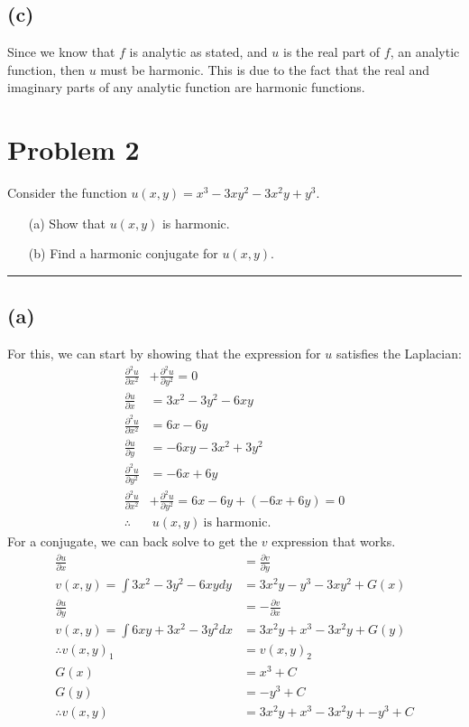 \documentclass{article}
\newcommand{\parder}[2]{\frac{\partial#1}{\partial#2}}
\newcommand{\secparder}[2]{\frac{\partial^2#1}{\partial#2^2}}
\begin{document}
\subsection{(c)}
Since we know that $f$ is analytic as stated, and $u$ is the real part of $f$, an analytic function, then $u$ must be harmonic. This is due to the fact that the real and imaginary parts of any analytic function are harmonic functions.
\newpage
\section*{Problem 2}
Consider the function  $u(x,y) = x^3 - 3 x y^2 - 3 x^2 y + y^3$.

\begin{enumerate}
	\item [(a)] Show that $u(x,y)$ is harmonic.
	\item [(b)] Find a harmonic conjugate for $u(x,y)$.
\end{enumerate}


\vspace{.5cm} %

\hrule
\subsection*{(a)}
For this, we can start by showing that the expression for $u$ satisfies the Laplacian:
\begin{align*}
  \secparder{u}{x} &+ \secparder{u}{y} = 0\\
  \parder{u}{x} &= 3x^2 - 3 y^2 - 6xy\\
  \secparder{u}{x} &= 6x - 6y\\
  \parder{u}{y} &= - 6 x y - 3 x^2  + 3y^2\\
  \secparder{u}{y} &= - 6 x  + 6y\\
  \secparder{u}{x} &+ \secparder{u}{y} = 6x - 6y + (- 6 x  + 6y) = 0\\
  \therefore &\ u(x,y)\ \text{is harmonic.}
\end{align*}
For a conjugate, we can back solve to get the $v$ expression that works.
\begin{align*}
  \parder{u}{x} &= \parder{v}{y} \\
  v(x,y) = \int 3x^2 - 3 y^2 - 6xy dy &= 3x^2y - y^3 - 3xy^2 + G(x)\\
  \parder{u}{y} &= -\parder{v}{x} \\
  v(x,y) = \int  6 x y + 3 x^2  - 3y^2 dx &= 3x^2y + x^3 -3x^2y + G(y)\\
  \therefore  v(x,y)_1 &= v(x,y)_2 \\
  G(x) &= x^3 + C\\
  G(y) &= -y^3 + C\\
  \therefore v(x,y) &= \boxed{ 3x^2y + x^3 -3x^2y + -y^3 + C}
\end{align*}
\newpage
\end{document}
